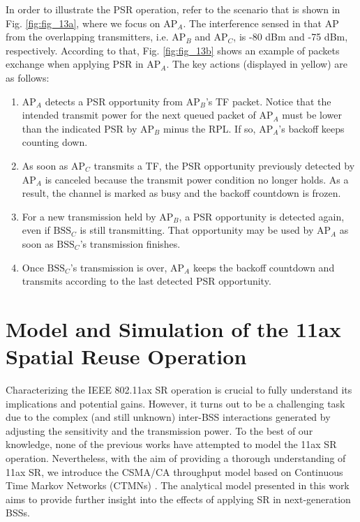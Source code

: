 \documentclass{ieeeaccess}
\begin{document}
In order to illustrate the PSR operation, refer to the scenario that is shown in Fig. \ref{fig:fig_13a}, where we focus on $\text{AP}_A$. The interference sensed in that AP from the overlapping transmitters, i.e. $\text{AP}_B$ and $\text{AP}_C$, is -80 dBm and -75 dBm, respectively. According to that, Fig. \ref{fig:fig_13b} shows an example of packets exchange when applying PSR in $\text{AP}_A$. The key actions (displayed in yellow) are as follows:
\begin{enumerate}
	\item $\text{AP}_A$ detects a PSR opportunity from $\text{AP}_B$'s TF packet. Notice that the intended transmit power for the next queued packet of $\text{AP}_A$ must be lower than the indicated PSR by $\text{AP}_B$ minus the RPL. If so, $\text{AP}_A$'s backoff keeps counting down.
	\item As soon as $\text{AP}_C$ transmits a TF, the PSR opportunity previously detected by $\text{AP}_A$ is canceled because the transmit power condition no longer holds. As a result, the channel is marked as busy and the backoff countdown is frozen.
	\item For a new transmission held by $\text{AP}_B$, a PSR opportunity is detected again, even if $\text{BSS}_C$ is still transmitting. That opportunity may be used by $\text{AP}_A$ as soon as $\text{BSS}_C$'s transmission finishes.
	\item Once $\text{BSS}_C$'s transmission is over, $\text{AP}_A$ keeps the backoff countdown and transmits according to the last detected PSR opportunity.
\end{enumerate}

\section{Model and Simulation of the 11ax Spatial Reuse Operation}
\label{section:analytical_model}

Characterizing the IEEE 802.11ax SR operation is crucial to fully understand its implications and potential gains. However, it turns out to be a challenging task due to the complex (and still unknown) inter-BSS interactions generated by adjusting the sensitivity and the transmission power. To the best of our knowledge, none of the previous works have attempted to model the 11ax SR operation. Nevertheless, with the aim of providing a thorough understanding of 11ax SR, we introduce the CSMA/CA throughput model based on Continuous Time Markov Networks (CTMNs) \cite{bellalta2014throughput, bellalta2017throughput}. The analytical model presented in this work aims to provide further insight into the effects of applying SR in next-generation BSSs.
\end{document}
